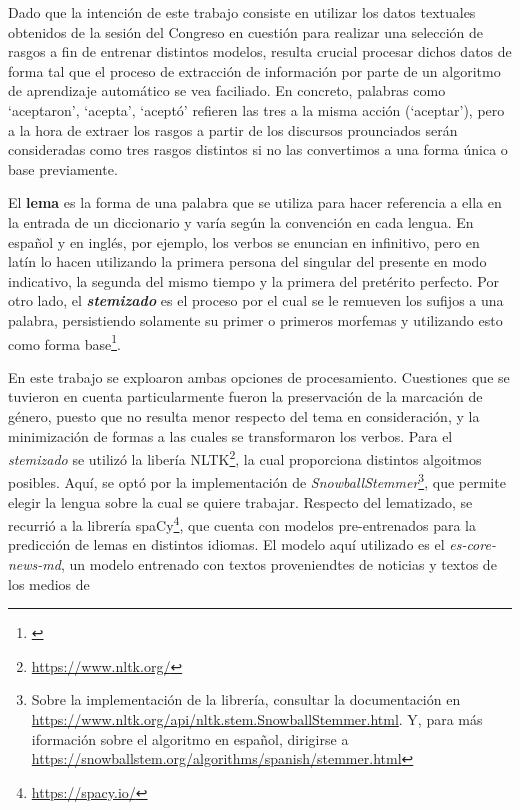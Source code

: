 Dado que la intención de este trabajo consiste en utilizar los datos textuales
obtenidos de la sesión del Congreso en cuestión para realizar una selección
de rasgos a fin de entrenar distintos modelos, resulta crucial procesar dichos
datos de forma tal que el proceso de extracción de información por parte
de un algoritmo de aprendizaje automático se vea faciliado. En concreto, palabras
como `aceptaron', `acepta', `aceptó' refieren las tres a la misma acción (`aceptar'),
pero a la hora de extraer los rasgos a partir de los discursos prounciados serán
consideradas como tres rasgos distintos si no las convertimos a una forma única o
base previamente.
\par
El \textbf{lema} es la forma de una palabra que se utiliza para hacer referencia a ella
en la entrada de un diccionario y varía según la convención en cada lengua. En español
y en inglés, por ejemplo, los verbos se enuncian en infinitivo, pero en latín lo hacen
utilizando la primera persona del singular del presente en modo indicativo, la segunda
del mismo tiempo y la primera del pretérito perfecto. Por otro lado, el
\textbf{\textit{stemizado}} es el proceso por el cual se le remueven los sufijos
a una palabra, persistiendo solamente su primer o primeros morfemas y utilizando
esto como forma base\footnote{\citet[Capítulo~3]{bird2009natural}}.
\par
En este trabajo se exploaron ambas opciones de procesamiento. Cuestiones que se tuvieron
en cuenta particularmente fueron la preservación de la marcación de género, puesto que
no resulta menor respecto del tema en consideración, y la minimización de formas a las
cuales se transformaron los verbos. Para el \textit{stemizado} se utilizó la
libería NLTK\footnote{\url{https://www.nltk.org/}}, la cual proporciona distintos algoitmos posibles. Aquí, se optó por la
implementación de \textit{SnowballStemmer}\footnote{Sobre la implementación de la
librería, consultar la documentación en
\url{https://www.nltk.org/api/nltk.stem.SnowballStemmer.html}. Y, para más iformación
sobre el algoritmo en español, dirigirse a
\url{https://snowballstem.org/algorithms/spanish/stemmer.html}}, que permite elegir
la lengua sobre la cual se quiere trabajar. Respecto del lematizado, se recurrió
a la librería spaCy\footnote{\url{https://spacy.io/}}, que cuenta con modelos
pre-entrenados para la predicción de lemas en distintos idiomas. El modelo aquí
utilizado es el \textit{es-core-news-md}, un modelo entrenado con textos
proveniendtes de noticias y textos de los medios de
